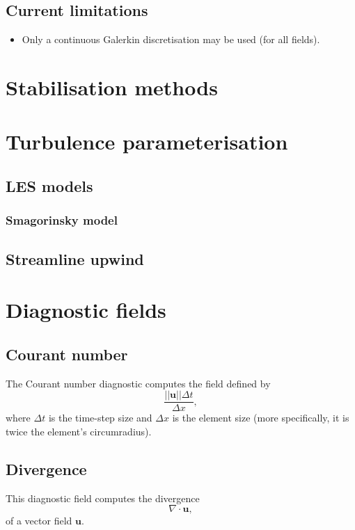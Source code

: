 \documentclass[a4paper,11pt]{report}
\begin{document}
\section{Current limitations}
\begin{itemize}
   \item Only a continuous Galerkin discretisation may be used (for all fields).
\end{itemize}

\chapter{Stabilisation methods}

\chapter{Turbulence parameterisation}

\section{LES models}

\subsection{Smagorinsky model}

\section{Streamline upwind}


\chapter{Diagnostic fields}

\section{Courant number}
The Courant number diagnostic computes the field defined by
\begin{equation}
   \frac{||\mathbf{u}||\Delta t}{\Delta x},
\end{equation}
where $\Delta t$ is the time-step size and $\Delta x$ is the element size (more specifically, it is twice the element's circumradius).

\section{Divergence}
This diagnostic field computes the divergence
\begin{equation}
   \nabla\cdot\mathbf{u},
\end{equation}
of a vector field $\mathbf{u}$.
\end{document}
